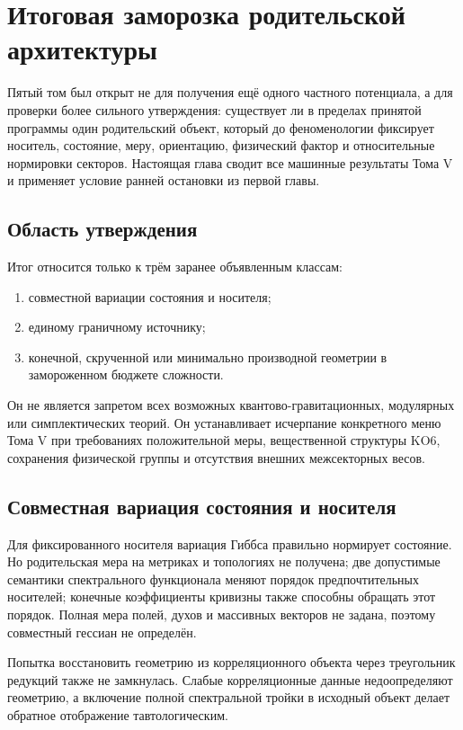 \chapter{Итоговая заморозка родительской архитектуры}

Пятый том был открыт не для получения ещё одного частного потенциала, а для
проверки более сильного утверждения: существует ли в пределах принятой
программы один родительский объект, который до феноменологии фиксирует
носитель, состояние, меру, ориентацию, физический фактор и относительные
нормировки секторов. Настоящая глава сводит все машинные результаты Тома V
и применяет условие ранней остановки из первой главы.

\section{Область утверждения}

Итог относится только к трём заранее объявленным классам:
\begin{enumerate}
 \item совместной вариации состояния и носителя;
 \item единому граничному источнику;
 \item конечной, скрученной или минимально производной геометрии в
 замороженном бюджете сложности.
\end{enumerate}
Он не является запретом всех возможных квантово-гравитационных,
модулярных или симплектических теорий. Он устанавливает исчерпание
конкретного меню Тома V при требованиях положительной меры, вещественной
структуры KO6, сохранения физической группы и отсутствия внешних
межсекторных весов.

\section{Совместная вариация состояния и носителя}

Для фиксированного носителя вариация Гиббса правильно нормирует состояние.
Но родительская мера на метриках и топологиях не получена; две допустимые
семантики спектрального функционала меняют порядок предпочтительных
носителей; конечные коэффициенты кривизны также способны обращать этот
порядок. Полная мера полей, духов и массивных векторов не задана, поэтому
совместный гессиан не определён.

Попытка восстановить геометрию из корреляционного объекта через треугольник
редукций также не замкнулась. Слабые корреляционные данные недоопределяют
геометрию, а включение полной спектральной тройки в исходный объект делает
обратное отображение тавтологическим.

